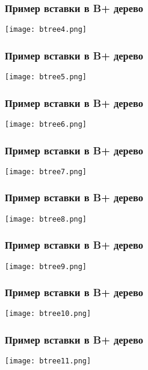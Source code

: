 \begin{frame}
\frametitle{Пример вставки в B+ дерево}
\begin{center}
  \texttt{[image: btree4.png]}
\end{center}
\end{frame}

\begin{frame}
\frametitle{Пример вставки в B+ дерево}
\begin{center}
  \texttt{[image: btree5.png]}
\end{center}
\end{frame}

\begin{frame}
\frametitle{Пример вставки в B+ дерево}
\begin{center}
  \texttt{[image: btree6.png]}
\end{center}
\end{frame}

\begin{frame}
\frametitle{Пример вставки в B+ дерево}
\begin{center}
  \texttt{[image: btree7.png]}
\end{center}
\end{frame}

\begin{frame}
\frametitle{Пример вставки в B+ дерево}
\begin{center}
  \texttt{[image: btree8.png]}
\end{center}
\end{frame}

\begin{frame}
\frametitle{Пример вставки в B+ дерево}
\begin{center}
  \texttt{[image: btree9.png]}
\end{center}
\end{frame}

\begin{frame}
\frametitle{Пример вставки в B+ дерево}
\begin{center}
  \texttt{[image: btree10.png]}
\end{center}
\end{frame}

\begin{frame}
\frametitle{Пример вставки в B+ дерево}
\begin{center}
  \texttt{[image: btree11.png]}
\end{center}
\end{frame}

